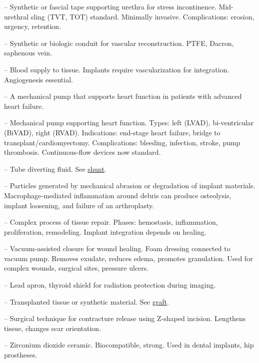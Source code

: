 -- Synthetic or fascial tape supporting urethra for stress incontinence. Mid-urethral sling (TVT, TOT) standard. Minimally invasive. Complications: erosion, urgency, retention.

-- Synthetic or biologic conduit for vascular reconstruction. PTFE, Dacron, saphenous vein.

-- Blood supply to tissue. Implants require vascularization for integration. Angiogenesis essential.

-- A mechanical pump that supports heart function in patients with advanced heart failure.

-- Mechanical pump supporting heart function. Types: left (LVAD), bi-ventricular (BiVAD), right (RVAD). Indications: end-stage heart failure, bridge to transplant/cardiomyectomy. Complications: bleeding, infection, stroke, pump thrombosis. Continuous-flow devices now standard.

-- Tube diverting fluid. See \hyperlink{Shunt}{shunt}.

-- Particles generated by mechanical abrasion or degradation of implant materials. Macrophage-mediated inflammation around debris can produce osteolysis, implant loosening, and failure of an arthroplasty.

-- Complex process of tissue repair. Phases: hemostasis, inflammation, proliferation, remodeling. Implant integration depends on healing.

-- Vacuum-assisted closure for wound healing. Foam dressing connected to vacuum pump. Removes exudate, reduces edema, promotes granulation. Used for complex wounds, surgical sites, pressure ulcers.

-- Lead apron, thyroid shield for radiation protection during imaging.

-- Transplanted tissue or synthetic material. See \hyperlink{Graft}{graft}.

-- Surgical technique for contracture release using Z-shaped incision. Lengthens tissue, changes scar orientation.

-- Zirconium dioxide ceramic. Biocompatible, strong. Used in dental implants, hip prostheses.
